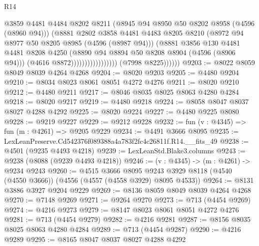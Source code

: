 \begin{lexlean}{R14}
\begin{coremodule}
                                          @3859
                                          @4481
                                          @4484
                                          @8202
                                          @8211
                                          (@8945 @94 @8950 @50 @8202 @8958 (@4596 (@8960 @94)))
                                          (@8881
                                            @2802
                                            @3858
                                            @4481
                                            @4483
                                            @8205
                                            @8210
                                            (@8972 @94 @8977 @50 @8205 @8985 (@4596 (@8987 @94)))
                                            (@8881
                                              @3856
                                              @130
                                              @4481
                                              @4481
                                              @8208
                                              @4250
                                              (@8890 @94 @8894 @50 @8208 @8904 (@4596 (@8906 @94)))
                                              (@4616 @8872)))))))))))))))))
              (@7998 @8225))))))
@9203 := @8022 @8059 @8049 @8039 @4264 @4268
@9204 := @8020 @9203
@9205 := @4480 @9204
@9210 := @8034 @8023 @8061 @8051 @4272 @4276
@9211 := @8020 @9210
@9212 := @4480 @9211
@9217 := @8046 @8035 @8025 @8063 @4280 @4284
@9218 := @8020 @9217
@9219 := @4480 @9218
@9224 := @8058 @8047 @8037 @8027 @4288 @4292
@9225 := @8020 @9224
@9227 := @4480 @9225 @8080
@9228 := @9219 @9227
@9229 := @9212 @9228
@9232 := fun (v : @4345) => fun (m : @4261) => @9205 @9229
@9234 := @4491 @3666 @8095
@9235 := LexLeanPreserve.Cd542376f089388a4a783f2fc4c26811f.R14.__fits_49
@9238 := @4501 (@9235 @4493 @4218)
@9239 := LexLeanStd.Blake3.columns
@9243 := @9238 (@8088 (@9239 @4493 @4218))
@9246 := (v : @4345) -> (m : @4261) -> @9234 @9243
@9260 := @4515
    @3666
    @8095
    @9243
    @3929
    @8118
    (@4540 (@4550 @3666))
    (@4556 (@4557 (@4558 @3929) @8095 @4533))
@9264 := @8131 @3886 @3927 @9204 @9229
@9269 := @8136 @8059 @8049 @8039 @4264 @4268
@9270 := @7148 @9269
@9271 := @9264 @9270
@9273 := @713 (@4454 @9269)
@9274 := @4216 @9273
@9279 := @8147 @8023 @8061 @8051 @4272 @4276
@9281 := @713 (@4454 @9279)
@9282 := @4216 @9281
@9287 := @8156 @8035 @8025 @8063 @4280 @4284
@9289 := @713 (@4454 @9287)
@9290 := @4216 @9289
@9295 := @8165 @8047 @8037 @8027 @4288 @4292

\end{coremodule}
\end{lexlean}
